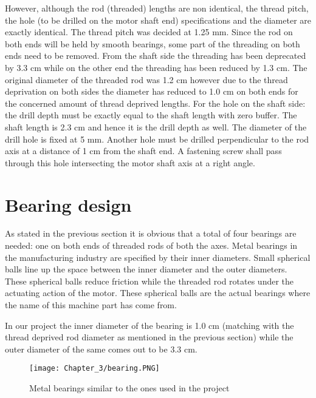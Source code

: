 However, although the rod (threaded) lengths are non identical, the thread pitch, the hole (to be drilled on the motor shaft end) specifications and the diameter are exactly identical. The thread pitch was decided at 1.25 mm. Since the rod on both ends will be held by smooth bearings, some part of the threading on both ends need to be removed. From the shaft side the threading has been deprecated by 3.3 cm while on the other end the threading has been reduced by 1.3 cm. The original diameter of the threaded rod was 1.2 cm however due to the thread deprivation on both sides the diameter has reduced to 1.0 cm on both ends for the concerned amount of thread deprived lengths. For the hole on the shaft side: the drill depth must be exactly equal to the shaft length with zero buffer. The shaft length is 2.3 cm and hence it is the drill depth as well. The diameter of the drill hole is fixed at 5 mm. Another hole must be drilled perpendicular to the rod axis at a distance of 1 cm from the shaft end. A fastening screw shall pass through this hole intersecting the motor shaft axis at a right angle.



\section{Bearing design}

As stated in the previous section it is obvious that a total of four bearings are needed: one on both ends of threaded rods of both the axes. Metal bearings in the manufacturing industry are specified by their inner diameters. Small spherical balls line up the space between the inner diameter and the outer diameters. These spherical balls reduce friction while the threaded rod rotates under the actuating action of the motor. These spherical balls are the actual bearings where the name of this machine part has come from. \par

In our project the inner diameter of the bearing is 1.0 cm (matching with the thread deprived rod diameter as mentioned in the previous section) while the outer diameter of the same comes out to be 3.3 cm. 

\begin{figure}[h]
    \centering
    \texttt{[image: Chapter\_3/bearing.PNG]}
    \caption{Metal bearings similar to the ones used in the project}
    \label{fig:bearing}
\end{figure}

